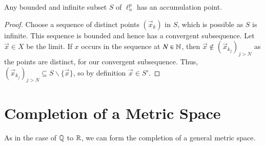 \begin{corollary}
    Any bounded and infinite subset $S$ of $\ell_n^p$ has an accumulation point.
\end{corollary}
\begin{proof}
    Choose a sequence of distinct points $(\vec{x}_k)$ in $S$, which is possible as $S$ is infinite. This sequence is bounded and hence has a convergent subsequence. Let $\vec{x} \in X$ be the limit. If $x$ occurs in the sequence at $N \in \mathbb N$, then $\vec{x} \notin (\vec{x}_{k_j})_{j > N}$ as the points are distinct, for our convergent subsequence. Thus, $(\vec{x}_{k_j})_{j > N} \subseteq S\backslash\{\vec{x}\}$, so by definition $\vec{x} \in S'$.
\end{proof}






\section{Completion of a Metric Space}

As in the case of $\mathbb Q$ to $\mathbb R$, we can form the completion of a general metric space.

